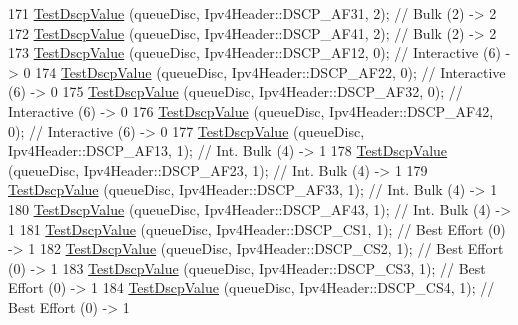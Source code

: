 \begin{DoxyCode}
171   \hyperlink{classPfifoFastQueueDiscDscpPrioritization_a153fd90bcf84e06728ad582d63544627}{TestDscpValue} (queueDisc, Ipv4Header::DSCP\_AF31, 2);    \textcolor{comment}{// Bulk (2)        -> 2}
172   \hyperlink{classPfifoFastQueueDiscDscpPrioritization_a153fd90bcf84e06728ad582d63544627}{TestDscpValue} (queueDisc, Ipv4Header::DSCP\_AF41, 2);    \textcolor{comment}{// Bulk (2)        -> 2}
173   \hyperlink{classPfifoFastQueueDiscDscpPrioritization_a153fd90bcf84e06728ad582d63544627}{TestDscpValue} (queueDisc, Ipv4Header::DSCP\_AF12, 0);    \textcolor{comment}{// Interactive (6) -> 0}
174   \hyperlink{classPfifoFastQueueDiscDscpPrioritization_a153fd90bcf84e06728ad582d63544627}{TestDscpValue} (queueDisc, Ipv4Header::DSCP\_AF22, 0);    \textcolor{comment}{// Interactive (6) -> 0}
175   \hyperlink{classPfifoFastQueueDiscDscpPrioritization_a153fd90bcf84e06728ad582d63544627}{TestDscpValue} (queueDisc, Ipv4Header::DSCP\_AF32, 0);    \textcolor{comment}{// Interactive (6) -> 0}
176   \hyperlink{classPfifoFastQueueDiscDscpPrioritization_a153fd90bcf84e06728ad582d63544627}{TestDscpValue} (queueDisc, Ipv4Header::DSCP\_AF42, 0);    \textcolor{comment}{// Interactive (6) -> 0}
177   \hyperlink{classPfifoFastQueueDiscDscpPrioritization_a153fd90bcf84e06728ad582d63544627}{TestDscpValue} (queueDisc, Ipv4Header::DSCP\_AF13, 1);    \textcolor{comment}{// Int. Bulk (4)   -> 1}
178   \hyperlink{classPfifoFastQueueDiscDscpPrioritization_a153fd90bcf84e06728ad582d63544627}{TestDscpValue} (queueDisc, Ipv4Header::DSCP\_AF23, 1);    \textcolor{comment}{// Int. Bulk (4)   -> 1}
179   \hyperlink{classPfifoFastQueueDiscDscpPrioritization_a153fd90bcf84e06728ad582d63544627}{TestDscpValue} (queueDisc, Ipv4Header::DSCP\_AF33, 1);    \textcolor{comment}{// Int. Bulk (4)   -> 1}
180   \hyperlink{classPfifoFastQueueDiscDscpPrioritization_a153fd90bcf84e06728ad582d63544627}{TestDscpValue} (queueDisc, Ipv4Header::DSCP\_AF43, 1);    \textcolor{comment}{// Int. Bulk (4)   -> 1}
181   \hyperlink{classPfifoFastQueueDiscDscpPrioritization_a153fd90bcf84e06728ad582d63544627}{TestDscpValue} (queueDisc, Ipv4Header::DSCP\_CS1, 1);     \textcolor{comment}{// Best Effort (0) -> 1}
182   \hyperlink{classPfifoFastQueueDiscDscpPrioritization_a153fd90bcf84e06728ad582d63544627}{TestDscpValue} (queueDisc, Ipv4Header::DSCP\_CS2, 1);     \textcolor{comment}{// Best Effort (0) -> 1}
183   \hyperlink{classPfifoFastQueueDiscDscpPrioritization_a153fd90bcf84e06728ad582d63544627}{TestDscpValue} (queueDisc, Ipv4Header::DSCP\_CS3, 1);     \textcolor{comment}{// Best Effort (0) -> 1}
184   \hyperlink{classPfifoFastQueueDiscDscpPrioritization_a153fd90bcf84e06728ad582d63544627}{TestDscpValue} (queueDisc, Ipv4Header::DSCP\_CS4, 1);     \textcolor{comment}{// Best Effort (0) -> 1}

\end{DoxyCode}
